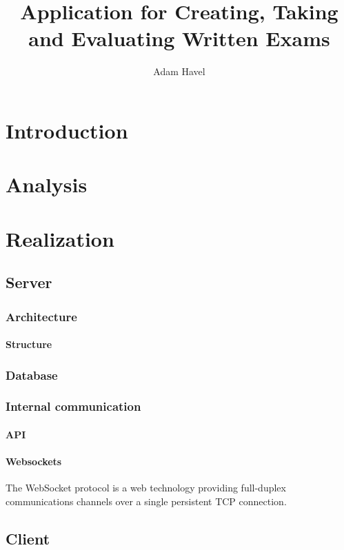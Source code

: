 \documentclass[thesis=M,english,hidelinks]{FITthesis}[2012/10/20]
\title{Application for Creating, Taking\\ and Evaluating Written Exams}
\author{Adam Havel}
\begin{document}
\chapter{Introduction}


\chapter{Analysis}

\chapter{Realization}

  \section{Server}

    \subsection{Architecture}

      \subsubsection{Structure}

    \subsection{Database}

    \subsection{Internal communication}

      \subsubsection{API}

      \subsubsection{Websockets}

The WebSocket protocol is a web technology providing full-duplex communications channels over a single persistent TCP connection.

\section{Client}
\end{document}

